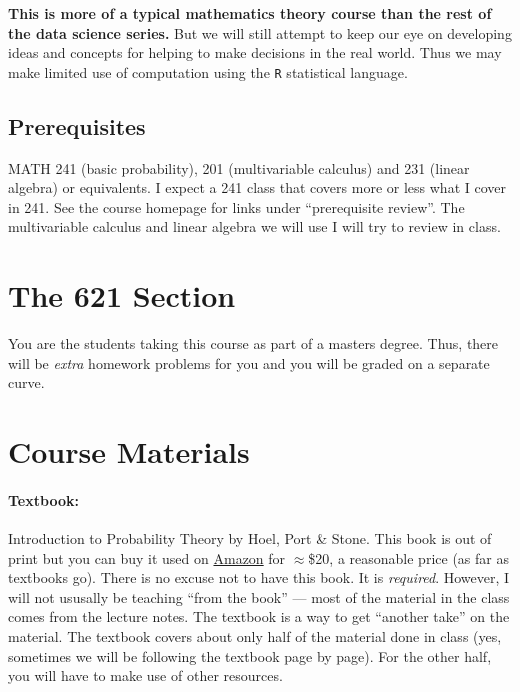 \documentclass[12pt]{article}
\newcommand{\qu}[1]{``#1''}
\begin{document}
\textbf{This is more of a typical mathematics theory course than the rest of the data science series.} But we will still attempt to keep our eye on developing ideas and concepts for helping to make decisions in the real world. Thus we may make limited use of computation using the \texttt{R} statistical language.

\subsection*{Prerequisites}

MATH 241 (basic probability), 201 (multivariable calculus) and 231 (linear algebra) or equivalents. I expect a 241 class that covers more or less what I cover in 241. See the course homepage for links under \qu{prerequisite review}. The multivariable calculus and linear algebra we will use I will try to review in class.

\section*{The 621 Section}

You are the students taking this course as part of a masters degree. Thus, there will be \textit{extra} homework problems for you and you will be graded on a separate curve.

\section*{Course Materials}

\paragraph{Textbook:} Introduction to Probability Theory by Hoel, Port \& Stone. This book is out of print but you can buy it used on \href{https://www.amazon.com/Introduction-Probability-Theory-Paul-Hoel/dp/039504636X/ref=sr_1_1?ie=UTF8&qid=1503515517&sr=8-1&keywords=introduction+to+probability+theory+hoel}{Amazon} for $\approx$\$20, a reasonable price (as far as textbooks go). There is no excuse not to have this book. It is \textit{required}. However, I will not ususally be teaching \qu{from the book} --- most of the material in the class comes from the lecture notes. The textbook is a way to get ``another take'' on the material. The textbook covers about only half of the material done in class (yes, sometimes we will be following the textbook page by page). For the other half, you will have to make use of other resources.
\end{document}
